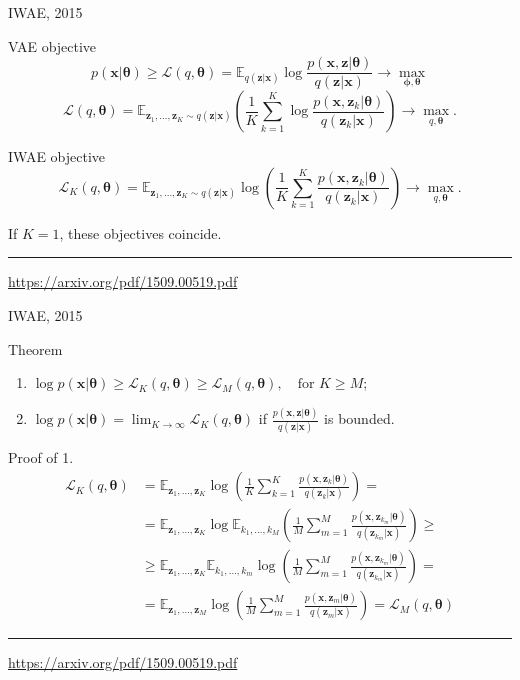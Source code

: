 \documentclass{beamer}
\newcommand{\bx}{\mathbf{x}}
\newcommand{\bz}{\mathbf{z}}
\newcommand{\btheta}{\boldsymbol{\theta}}
\newcommand{\bphi}{\boldsymbol{\phi}}
\begin{document}
\begin{frame}{IWAE, 2015}
\begin{block}{VAE objective}
\vspace{-0.2cm}
\[
	p(\bx | \btheta) \geq \mathcal{L} (q, \btheta)  = \mathbb{E}_{q(\bz | \bx)} \log \frac{p(\bx, \bz | \btheta)}{q(\bz| \bx)} \rightarrow \max_{\bphi, \btheta}
\]
\[
    \mathcal{L} (q, \btheta)  = \mathbb{E}_{\bz_1, \dots, \bz_K \sim q(\bz | \bx)} \left( \frac{1}{K} \sum_{k=1}^K \log \frac{p(\bx, \bz_k | \btheta)}{q(\bz_k| \bx)} \right) \rightarrow \max_{q, \btheta}.
\]
\vspace{-0.2cm}
\end{block}
\begin{block}{IWAE objective}
\vspace{-0.2cm}
\[
	\mathcal{L}_K (q, \btheta)  = \mathbb{E}_{\bz_1, \dots, \bz_K \sim q(\bz | \bx)} \log \left( \frac{1}{K}\sum_{k=1}^K\frac{p(\bx, \bz_k | \btheta)}{q(\bz_k| \bx)} \right) \rightarrow \max_{q, \btheta}.
\]
\end{block}
If $K=1$, these objectives coincide.

\vfill
\hrule\medskip
{\scriptsize \href{https://arxiv.org/pdf/1509.00519.pdf}{https://arxiv.org/pdf/1509.00519.pdf}}
\end{frame}
\begin{frame}{IWAE, 2015}
\begin{block}{Theorem}
\begin{enumerate}
    \item $\log p(\bx | \btheta) \geq \mathcal{L}_K (q, \btheta) \geq \mathcal{L}_M (q, \btheta), \quad \text{for } K \geq M$;
    \item $\log p(\bx | \btheta) = \lim_{K \rightarrow \infty} \mathcal{L}_K (q, \btheta)$ if $\frac{p(\bx, \bz | \btheta)}{q(\bz | \bx)}$ is bounded.
\end{enumerate}
\vspace{-0.2cm}
\end{block}
\begin{block}{Proof of 1.}
{ \footnotesize
\vspace{-0.5cm}
    \begin{align*}
        \mathcal{L}_K (q, \btheta) &= \mathbb{E}_{\bz_1, \dots, \bz_K} \log \left( \frac{1}{K}\sum_{k=1}^K\frac{p(\bx, \bz_k | \btheta)}{q(\bz_k| \bx)} \right) = \\
        &= \mathbb{E}_{\bz_1, \dots, \bz_K} \log \mathbb{E}_{k_1, \dots, k_M} \left( \frac{1}{M}\sum_{m=1}^M\frac{p(\bx, \bz_{k_m} | \btheta)}{q(\bz_{k_m}| \bx)} \right) \geq \\
        &\geq \mathbb{E}_{\bz_1, \dots, \bz_K} \mathbb{E}_{k_1, \dots, k_m} \log \left( \frac{1}{M}\sum_{m=1}^M\frac{p(\bx, \bz_{k_m} | \btheta)}{q(\bz_{k_m}| \bx)} \right) = \\
        &= \mathbb{E}_{\bz_1, \dots, \bz_M} \log \left( \frac{1}{M}\sum_{m=1}^M\frac{p(\bx, \bz_m | \btheta)}{q(\bz_m| \bx)} \right) = \mathcal{L}_M (q, \btheta)
    \end{align*}
}
\end{block}
    
\vfill
\hrule\medskip
{\scriptsize \href{https://arxiv.org/pdf/1509.00519.pdf}{https://arxiv.org/pdf/1509.00519.pdf}}
\end{frame}
\end{document}
